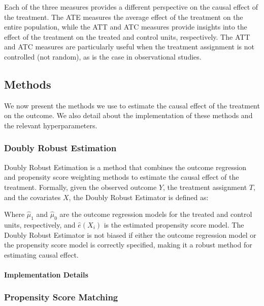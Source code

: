 \documentclass[11pt]{article}
\newcommand{\todo}[1]{{\color{orange}{TODO: #1}}}
\newcommand{\gur}[1]{{\color{teal}{Gur: #1}}}
\begin{document}
Each of the three measures provides a different perspective on the causal effect of the treatment. The ATE measures the average effect of the treatment on the entire population, while the ATT and ATC measures provide insights into the effect of the treatment on the treated and control units, respectively. The ATT and ATC measures are particularly useful when the treatment assignment is not controlled (not random), as is the case in observational studies.

\subsection{Methods}

\gur{Maybe covariates adjustment, IPW, Doubly Robust, Matching, one more sophisticated method. (the first 3 have nice rhythm together).}

We now present the methods we use to estimate the causal effect of the treatment on the outcome. We also detail about the implementation of these methods and the relevant hyperparameters.

\subsubsection{Doubly Robust Estimation}

Doubly Robust Estimation is a method that combines the outcome regression and propensity score weighting methods to estimate the causal effect of the treatment. Formally, given the observed outcome $Y$, the treatment assignment $T$, and the covariates $X$, the Doubly Robust Estimator is defined as:

\gur{Add the formula here.}

Where $\hat{\mu}_1$ and $\hat{\mu}_0$ are the outcome regression models for the treated and control units, respectively, and $\hat{e}(X_i)$ is the estimated propensity score model. The Doubly Robust Estimator is not biased if either the outcome regression model or the propensity score model is correctly specified, making it a robust method for estimating causal effect.

\paragraph{Implementation Details} \todo{Details about the implementation of the Doubly Robust Estimator.}


\subsubsection{Propensity Score Matching}
\end{document}
